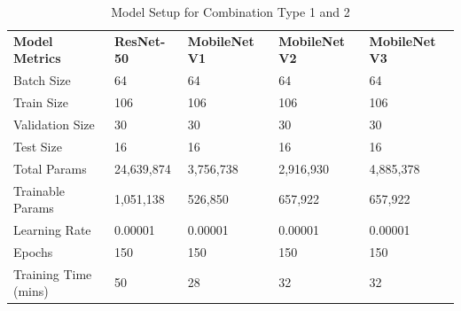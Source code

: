 \begin{table}[H]
\begin{tabularx}{\textwidth}{@{} *5{X} @{}}
\addlinespace
\addlinespace
\midrule
\multicolumn{5}{c}{\textbf{Model Variation Type 2 (\ref{subsubsec:variation_2})}}                                    \\ \midrule
\raggedright \textbf{Model Metrics}           & \textbf{ResNet-50} & \textbf{MobileNet V1} & \textbf{MobileNet V2} & \textbf{MobileNet V3} \\ \midrule
Batch Size           &  64                    &  64             &  64               &   64           \\ \midrule
Train Size           &  106                   & 106             &  106              &   106               \\  \midrule
Validation Size      &  30                      &  30            &  30              &   30           \\ \midrule
Test Size            &  16                      &  16            &  16              &   16           \\ \midrule
\raggedright Total Params     & 24,639,874      &  3,756,738            & 2,916,930 &   4,885,378           \\ \midrule
\raggedright Trainable Params & 1,051,138       & 526,850             &  657,922    &   657,922           \\ \midrule
Learning Rate        &  0.00001                 & 0.00001             &  0.00001    &   0.00001           \\ \midrule
Epochs               &  150                     & 150             &  150            &   150           \\ \midrule
Training Time (mins)        &  50               & 28             &   32             &   32           \\ \midrule
\bottomrule
\end{tabularx}
\caption{Model Setup for Combination Type 1 and 2 }
\label{table:results_3}
\end{table}


